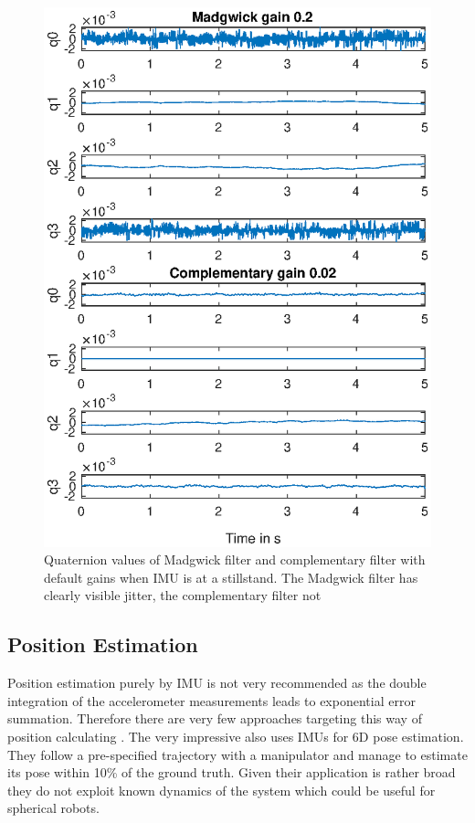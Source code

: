 \documentclass[letterpaper, 10 pt, conference]{ieeeconf}  %
\begin{document}
\begin{figure}[thpb]
\includegraphics[width=\linewidth]{./graphics/MadgwickVsComplementaryNoMovement.eps}
\caption{Quaternion values of Madgwick filter and complementary filter with default gains when IMU is at a stillstand. The Madgwick filter has clearly visible jitter, the complementary filter not }
\label{madgVsComp1}
\end{figure}



\subsection{Position Estimation}
Position estimation purely by IMU is not very recommended as the double integration of the accelerometer measurements leads to exponential error summation.
Therefore there are very few approaches targeting this way of position calculating \cite{c3}.
The very impressive \cite{Valencia2017ASM} also uses IMUs for 6D pose estimation.
They follow a pre-specified trajectory with a manipulator and manage to estimate its pose within 10\% of the ground truth.
Given their application is rather broad they do not exploit known dynamics of the system which could be useful for spherical robots.
\end{document}
